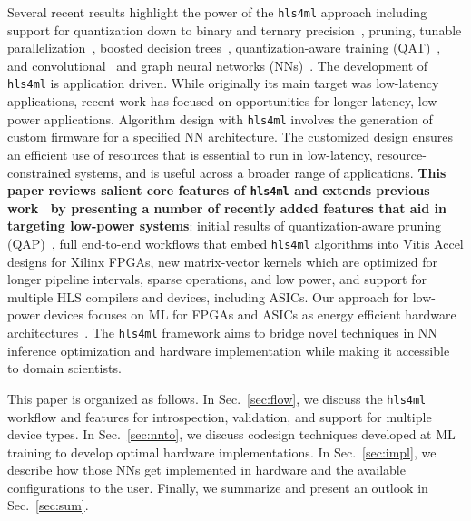 \documentclass[tinyml]{acmart}
\newcommand{\hlsfml}{\texttt{hls4ml}\xspace}
\begin{document}
Several recent results highlight the power of the \hlsfml approach including support for quantization down to binary and ternary precision~\cite{DiGuglielmo:2020eqx}, pruning, tunable parallelization~\cite{Duarte:2018ite}, boosted decision trees~\cite{Summers:2020xiy}, quantization-aware training (QAT)~\cite{Coelho:2020zfu}, and convolutional~\cite{Aarrestad:2021zos} and graph neural networks (NNs)~\cite{Iiyama:2020wap}.
The development of \hlsfml is application driven.
While originally its main target was low-latency applications, recent work has focused on opportunities for longer latency, low-power applications.
Algorithm design with \hlsfml involves the generation of custom firmware for a specified NN architecture.
The customized design ensures an efficient use of resources that is essential to run in low-latency, resource-constrained systems, and is useful across a broader range of applications.
\textbf{This paper reviews salient core features of \hlsfml and extends previous work~\cite{Duarte:2018ite,DiGuglielmo:2020eqx,Summers:2020xiy,Coelho:2020zfu,Aarrestad:2021zos} by presenting a number of recently added features that aid in targeting low-power systems}: initial results of quantization-aware pruning (QAP)~\cite{Hawks:2021ruw}, full end-to-end workflows that embed \hlsfml algorithms into Vitis Accel designs for Xilinx FPGAs, new matrix-vector kernels which are optimized for longer pipeline intervals, sparse operations, and low power, and support for multiple HLS compilers and devices, including ASICs.
Our approach for low-power devices focuses on ML for FPGAs and ASICs as energy efficient hardware architectures~\cite{GapFPGAsASIC,ComputingsEnergy}.
The \hlsfml framework aims to bridge novel techniques in NN inference optimization and hardware implementation while making it accessible to domain scientists.

This paper is organized as follows.
In Sec.~\ref{sec:flow}, we discuss the \hlsfml workflow and features for introspection, validation, and support for multiple device types.
In Sec.~\ref{sec:nnto}, we discuss codesign techniques developed at ML training to develop optimal hardware implementations.
In Sec.~\ref{sec:impl}, we describe how those NNs get implemented in hardware and the available configurations to the user.
Finally, we summarize and present an outlook in Sec.~\ref{sec:sum}.
\end{document}
